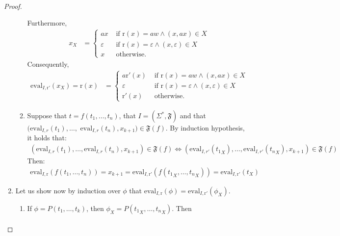 \documentclass[a4paper]{llncs}
\begin{document}
\begin{proof}
\begin{enumerate}
\begin{enumerate}
        Furthermore,
        \begin{align*}
          x_X&=
            \begin{cases}
                  ax & \text{ if }\mathrm{r}(x)=aw \wedge (x,ax)\in X\\
                  \varepsilon & \text{ if }\mathrm{r}(x)=\varepsilon \wedge (x,\varepsilon)\in X\\
                  x & \text{ otherwise.}
             \end{cases}
         \end{align*}        
        Consequently,
        \begin{align*}
          \mathrm{eval}_{I,\mathrm{r}'}(x_X)=\mathrm{r}(x)  & =
            \begin{cases}
                  a\mathrm{r}'(x) & \text{ if }\mathrm{r}(x)=aw \wedge (x,ax)\in X\\
                  \varepsilon & \text{ if }\mathrm{r}(x)=\varepsilon \wedge (x,\varepsilon)\in X\\
                  \mathrm{r}'(x) & \text{ otherwise.}
            \end{cases}
         \end{align*}
      \item Suppose that $t=f(t_1,\ldots,t_n)$, that $I=(\Sigma^*,\mathfrak{F})$ and that $(\mathrm{eval}_{I,r}(t_1),\ldots,$ $\mathrm{eval}_{I,r}(t_n),x_{k+1})\in \mathfrak{F}(f)$. 
      By induction hypothesis, it holds that:
        \begin{align*}
          (\mathrm{eval}_{I,r}(t_1),\ldots,\mathrm{eval}_{I,r}(t_n),x_{k+1})\in \mathfrak{F}(f) \Leftrightarrow (\mathrm{eval}_{I,r'}({t_1}_X),\ldots,\mathrm{eval}_{I,r'}({t_n}_X),x_{k+1})\in \mathfrak{F}(f)
         \end{align*}
        Then:
        \begin{align*}
        \mathrm{eval}_{I,\mathrm{r}}(f(t_1,\ldots,t_n)) =x_{k+1} =\mathrm{eval}_{I,\mathrm{r}'}(f({t_1}_X,\ldots,{t_n}_X)) =\mathrm{eval}_{I,\mathrm{r}'}({t}_X)
         \end{align*}
    \end{enumerate}    
    \item Let us show now by induction over $\phi$ that $\mathrm{eval}_{I,\mathrm{r}}(\phi)=\mathrm{eval}_{I,\mathrm{r}'}(\phi_X)$.    
    \begin{enumerate}
      \item If $\phi=P(t_1,\ldots,t_k)$, then $\phi_X=P({t_1}_X,\ldots,{t_n}_X)$.
        Then
        \begin{align*}

\end{align*}
\end{enumerate}
\end{enumerate}
\end{proof}
\end{document}
